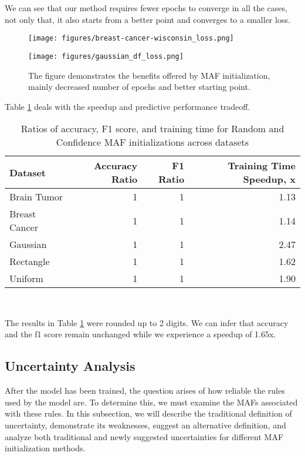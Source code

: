 \documentclass[10pt,a4paper,oneside]{article}
\begin{document}
We can see that our method requires fewer epochs to converge in all the cases, not only that, it also starts from a better point and converges to a smaller loss.

\FloatBarrier

\begin{figure}[htbp]
    \centering
    \label{talbe-ratios}
    \begin{minipage}{0.49\textwidth}
        \texttt{[image: figures/breast-cancer-wisconsin\_loss.png]} %
    \end{minipage}\hfill
    \begin{minipage}{0.49\textwidth}
        \texttt{[image: figures/gaussian\_df\_loss.png]} %
    \end{minipage}
    \caption{The figure demonstrates the benefits offered by MAF initialization, mainly decreased number of epochs and better starting point.}
    \label{fig:side_by_side}
\end{figure}

\newpage
Table \ref{table-ratios} deals with the speedup and predictive performance tradeoff. \\

\begin{table}[htbp]
    \centering
    \caption{Ratios of accuracy, F1 score, and training time for Random and Confidence MAF initializations across datasets}
    \label{table-ratios}
    \begin{tabular}{l|r|r|r}
    \toprule
    Dataset & Accuracy Ratio & F1 Ratio & Training Time Speedup, x \\
    \midrule
Brain Tumor & 1 & 1 & 1.13 \\
Breast Cancer & 1 & 1 & 1.14 \\
Gaussian & 1 & 1 & 2.47 \\
Rectangle & 1 & 1 & 1.62 \\
Uniform & 1 & 1 & 1.90 \\
    \bottomrule
    \end{tabular} \\
\end{table}

The results in Table \ref{table-ratios} were rounded up to 2 digits. We can infer that accuracy and the f1 score remain unchanged while we experience a speedup of 1.65x.


\subsection{Uncertainty Analysis}
After the model has been trained, the question arises of how reliable the rules used by the model are. To determine this, we must examine the MAFs associated with these rules. In this subsection, we will describe the traditional definition of uncertainty, demonstrate its weaknesses, suggest an alternative definition, and analyze both traditional and newly suggested uncertainties for different MAF initialization methods.
\end{document}
